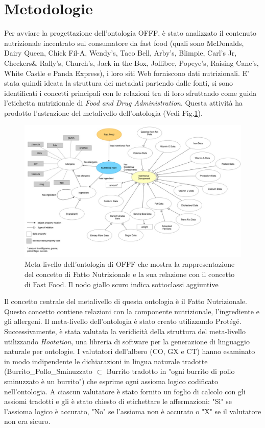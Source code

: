 \section{Metodologie}

Per avviare la progettazione dell'ontologia OFFF, è stato analizzato il contenuto nutrizionale incentrato sul consumatore da fast food (quali sono McDonalds, Dairy Queen, Chick Fil-A, Wendy's, Taco Bell, Arby's, Blimpie, Carl's Jr, Checkers\& Rally's, Church's, Jack in the Box, Jollibee, Popeye's, Raising Cane's, White Castle e Panda Express), i loro siti Web forniscono dati nutrizionali. 
E' stata quindi ideata la struttura dei metadati partendo dalle fonti, si sono identificati i concetti principali con le relazioni tra di loro sfruttando come guida l'etichetta nutrizionale di \emph{Food and Drug Administration}. 
Questa attività ha prodotto l'astrazione del metalivello dell'ontologia (Vedi Fig.\ref{fig:ontology}). 
\begin{figure}[H]
    \centering
    \includegraphics[width=\textwidth]{res/WS_01_Ontology_Meta_Level.jpg}
    \caption{Meta-livello dell'ontologia di OFFF che mostra la rappresentazione del concetto di Fatto Nutrizionale e la sua relazione con il concetto di Fast Food. Il nodo giallo scuro indica sottoclassi aggiuntive}
     \label{fig:ontology}
\end{figure}
Il concetto centrale del metalivello di questa ontologia è il Fatto Nutrizionale. Questo concetto contiene relazioni con la componente nutrizionale, l'ingrediente e gli allergeni. Il meta-livello dell'ontologia è stato creato utilizzando Protégé.
Successivamente, è stata valutata la veridicità della struttura del meta-livello utilizzando \emph{Hootation}, una libreria di software per la generazione di linguaggio naturale per ontologie. 
I valutatori dell'albero (CO, GX e CT) hanno esaminato in modo indipendente le dichiarazioni in lingua naturale tradotte (Burrito\_Pollo\_Sminuzzato $\subset$ Burrito tradotto in "ogni burrito di pollo sminuzzato è un burrito") che esprime ogni assioma logico codificato nell'ontologia. 
A ciascun valutatore è stato fornito un foglio di calcolo con gli assiomi tradotti e gli è stato chiesto di etichettare le affermazioni: "Sì" se l'assioma logico è accurato, "No" se l'assioma non è accurato o "X" se il valutatore non era sicuro.

